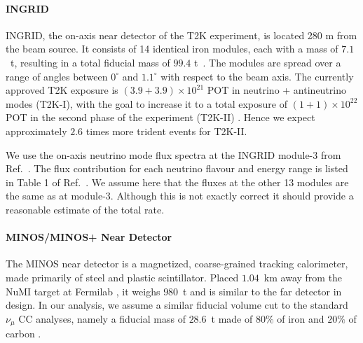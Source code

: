 \paragraph{INGRID} INGRID, the on-axis near detector of the T2K experiment, is located 280 m from the beam source. It consists of 14 identical iron modules, each with a mass of $7.1$~t, resulting in a total fiducial mass of $99.4$ t~\cite{Abe:2011xv}. The modules are spread over a range of angles between $0^\circ$ and $1.1^\circ$ with respect to the beam axis. The currently approved T2K exposure is $(3.9+3.9)\times 10^{21}$ 
POT in neutrino + antineutrino modes (T2K-I), with the goal to increase it to a total exposure of $(1+1)\times 10^{22}$ POT in the second phase of the experiment (T2K-II) \cite{Abe:2016tez}. Hence we expect approximately $2.6$ times more trident events for T2K-II. 

We use the on-axis neutrino mode flux spectra at the INGRID module-3 from Ref.~\cite{Abe:2015biq}. The flux contribution for each neutrino flavour and  energy range is listed in Table 1 of Ref.~\cite{Abe:2015biq}. We assume here that the fluxes at the other 13 modules are the same as at module-3. Although this is not exactly correct it should provide a reasonable estimate of the total rate.

\paragraph{MINOS/MINOS+ Near Detector} The MINOS near detector is a magnetized, coarse-grained tracking calorimeter, made primarily of steel and plastic scintillator. Placed $1.04$~km away from the NuMI target at Fermilab \cite{Aliaga:2016oaz}, it weighs $980$~t and is similar to the far detector in design. In our analysis, we assume a similar fiducial volume cut to the standard $\nu_\mu$ CC analyses, namely a fiducial mass of $28.6$~t made of $80\%$ of iron and $20\%$ of carbon \cite{Boehm:2009zz}.

